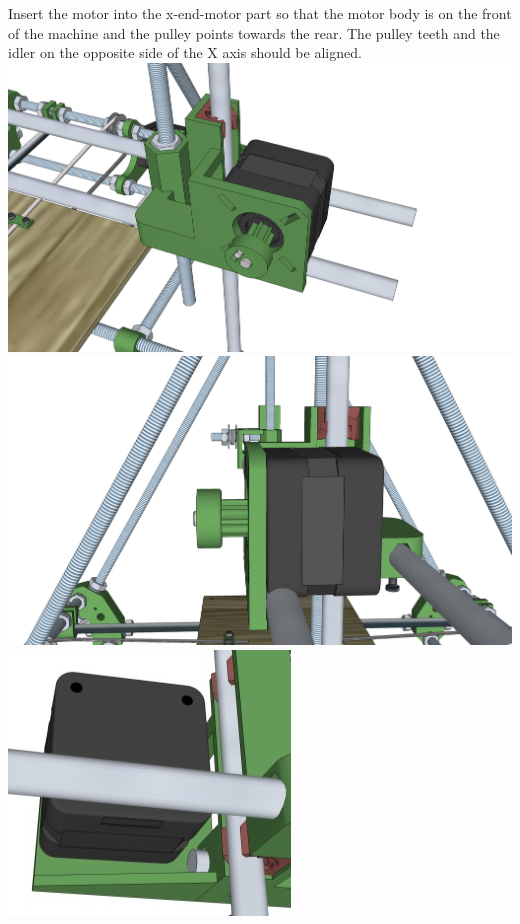 \documentclass[twoside,openany,a4paper,titlepage]{memoir}
\begin{document}
	\section{}
	Insert the motor into the x-end-motor part so that the motor body is on the front of the machine and the
	pulley points towards the rear. The pulley teeth and the idler on the opposite side of the X axis should
	be aligned.\\
	\includegraphics[width=1\linewidth]{graphics/ch9_5_1.png}
	\includegraphics[width=1\linewidth]{graphics/ch9_5_2.png}
	\includegraphics[width=1\linewidth]{graphics/ch9_5_3.png}	
\end{document}
